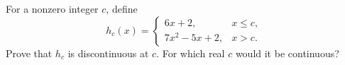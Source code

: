 For a nonzero integer $c$, define
\[
h_c(x)=\begin{cases}6x+2,&x\le c,\\7x^2-5x+2,&x>c.\end{cases}
\]
Prove that $h_c$ is discontinuous at $c$. For which real $c$ would it be continuous?

